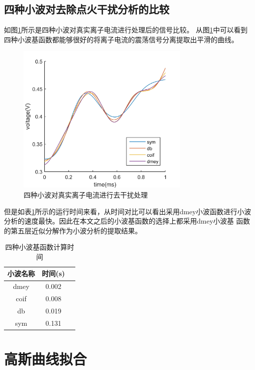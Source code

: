 \subsection{四种小波对去除点火干扰分析的比较}
如图\ref{fig:diff_wv_comp}所示是四种小波对真实离子电流进行处理后的信号比较。
从图\ref{fig:diff_wv_comp}中可以看到四种小波基函数都能够很好的将离子电流的震荡信号分离提取出平滑的曲线。\par
\begin{figure}[htb]
		\centering
		\includegraphics[width=0.75\textwidth]{thesis_figure/ion_chapter/diff_wv_comp}
		\caption{\label{fig:diff_wv_comp}四种小波对真实离子电流进行去干扰处理}
\end{figure}
但是如表\ref{wv_diff}所示的运行时间来看，从时间对比可以看出采用dmey小波函数进行小波分析的速度最快。因此在本文之后的小波基函数的选择上都采用dmey小波基
函数的第五层近似分解作为小波分析的提取结果。
\begin{table}[htb]
	\centering
	\caption{\label{wv_diff}四种小波基函数计算时间}
	\begin{tabular}{|c|c|c|}
		\hline
		小波名称&时间(s)\\\hline
		dmey & 0.002    	\\\hline
		coif & 0.008     	\\\hline
		db   & 0.019		\\\hline
		sym  & 0.131		\\\hline
	\end{tabular}
\end{table}
\section{高斯曲线拟合}
